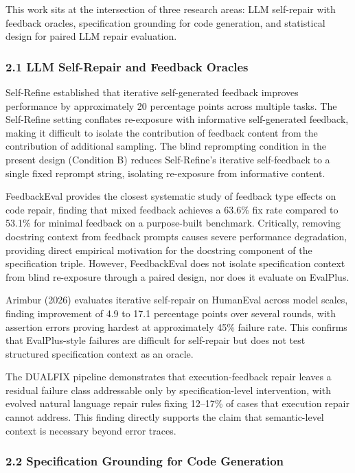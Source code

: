 
This work sits at the intersection of three research areas: LLM self-repair with feedback oracles, specification grounding for code generation, and statistical design for paired LLM repair evaluation.

\subsubsection{2.1 LLM Self-Repair and Feedback Oracles}

Self-Refine \citep{Madaan2023SelfRefine} established that iterative self-generated feedback improves performance by approximately 20 percentage points across multiple tasks. The Self-Refine setting conflates re-exposure with informative self-generated feedback, making it difficult to isolate the contribution of feedback content from the contribution of additional sampling. The blind reprompting condition in the present design (Condition B) reduces Self-Refine's iterative self-feedback to a single fixed reprompt string, isolating re-exposure from informative content.

FeedbackEval \citep{Dai2025FeedbackEval} provides the closest systematic study of feedback type effects on code repair, finding that mixed feedback achieves a 63.6\% fix rate compared to 53.1\% for minimal feedback on a purpose-built benchmark. Critically, removing docstring context from feedback prompts causes severe performance degradation, providing direct empirical motivation for the docstring component of the specification triple. However, FeedbackEval does not isolate specification context from blind re-exposure through a paired design, nor does it evaluate on EvalPlus.

Arimbur (2026) evaluates iterative self-repair on HumanEval across model scales, finding improvement of 4.9 to 17.1 percentage points over several rounds, with assertion errors proving hardest at approximately 45\% failure rate. This confirms that EvalPlus-style failures are difficult for self-repair but does not test structured specification context as an oracle.

The DUALFIX pipeline \citep{Akli2026Failing} demonstrates that execution-feedback repair leaves a residual failure class addressable only by specification-level intervention, with evolved natural language repair rules fixing 12--17\% of cases that execution repair cannot address. This finding directly supports the claim that semantic-level context is necessary beyond error traces.

\subsubsection{2.2 Specification Grounding for Code Generation}

